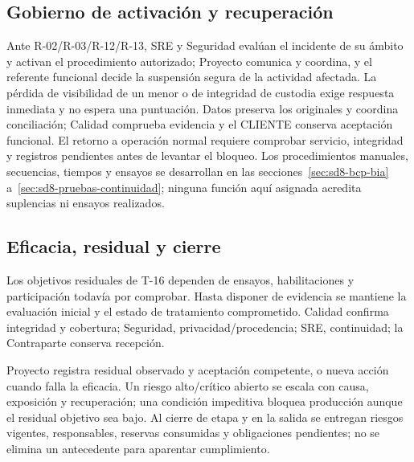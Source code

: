 





\subsection{Gobierno de activación y recuperación}\label{sec:sd8-gobierno-recuperacion}
Ante R-02/R-03/R-12/R-13, SRE y Seguridad evalúan el incidente de su ámbito y activan el procedimiento autorizado; Proyecto comunica y coordina, y el referente funcional decide la suspensión segura de la actividad afectada. La pérdida de visibilidad de un menor o de integridad de custodia exige respuesta inmediata y no espera una puntuación. Datos preserva los originales y coordina conciliación; Calidad comprueba evidencia y el CLIENTE conserva aceptación funcional. El retorno a operación normal requiere comprobar servicio, integridad y registros pendientes antes de levantar el bloqueo. Los procedimientos manuales, secuencias, tiempos y ensayos se desarrollan en las secciones~\ref{sec:sd8-bcp-bia} a~\ref{sec:sd8-pruebas-continuidad}; ninguna función aquí asignada acredita suplencias ni ensayos realizados.




\subsection{Eficacia, residual y cierre}
Los objetivos residuales de T-16 dependen de ensayos, habilitaciones y participación todavía por comprobar. Hasta disponer de evidencia se mantiene la evaluación inicial y el estado de tratamiento comprometido. Calidad confirma integridad y cobertura; Seguridad, privacidad/procedencia; SRE, continuidad; la Contraparte conserva recepción.

Proyecto registra residual observado y aceptación competente, o nueva acción cuando falla la eficacia. Un riesgo alto/crítico abierto se escala con causa, exposición y recuperación; una condición impeditiva bloquea producción aunque el residual objetivo sea bajo. Al cierre de etapa y en la salida se entregan riesgos vigentes, responsables, reservas consumidas y obligaciones pendientes; no se elimina un antecedente para aparentar cumplimiento.


